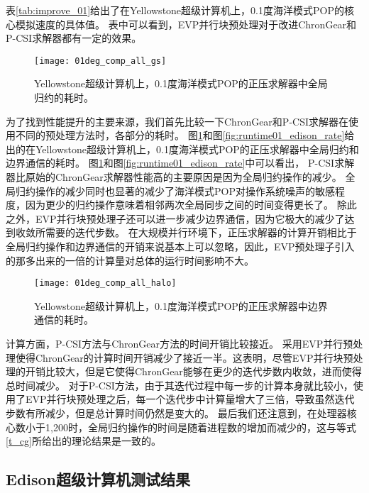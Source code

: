 表\ref{tab:improve_01}给出了在Yellowstone超级计算机上，0.1度海洋模式POP的核心模拟速度的具体值。
表中可以看到，EVP并行块预处理对于改进ChronGear和P-CSI求解器都有一定的效果。



\begin {figure}[!h]
\begin{center}
\texttt{[image: 01deg\_comp\_all\_gs]}
\end{center}
\caption[] {Yellowstone超级计算机上，0.1度海洋模式POP的正压求解器中全局归约的耗时。}
\label{fig:component_gs}
\end {figure}

为了找到性能提升的主要来源，我们首先比较一下ChronGear和P-CSI求解器在使用不同的预处理方法时，各部分的耗时。 
图\ref{fig:component_gs}和图\ref{fig:runtime01_edison_rate}给出的在Yellowstone超级计算机上，0.1度海洋模式POP的正压求解器中全局归约和边界通信的耗时。 
图\ref{fig:component_gs}和图\ref{fig:runtime01_edison_rate}中可以看出， P-CSI求解器比原始的ChronGear求解器性能高的主要原因是因为全局归约操作的减少。 
全局归约操作的减少同时也显著的减少了海洋模式POP对操作系统噪声的敏感程度\cite{ferreira}，因为更少的归约操作意味着相邻两次全局同步之间的时间变得更长了。 
除此之外，EVP并行块预处理子还可以进一步减少边界通信，因为它极大的减少了达到收敛所需要的迭代步数。 
在大规模并行环境下，正压求解器的计算开销相比于全局归约操作和边界通信的开销来说基本上可以忽略，因此，EVP预处理子引入的那多出来的一倍的计算量对总体的运行时间影响不大。

\begin {figure}[!h]
\begin{center}
\texttt{[image: 01deg\_comp\_all\_halo]}
\end{center}
\caption[] {Yellowstone超级计算机上，0.1度海洋模式POP的正压求解器中边界通信的耗时。}
\label{fig:component_halo}
\end {figure}
计算方面，P-CSI方法与ChronGear方法的时间开销比较接近。 
采用EVP并行预处理使得ChronGear的计算时间开销减少了接近一半。这表明，尽管EVP并行块预处理的开销比较大，但是它使得ChronGear能够在更少的迭代步数内收敛，进而使得总时间减少。 
对于P-CSI方法，由于其迭代过程中每一步的计算本身就比较小，使用了EVP并行块预处理之后，每一个迭代步中计算量增大了三倍，导致虽然迭代步数有所减少，但是总计算时间仍然是变大的。
最后我们还注意到，在处理器核心数小于1,200时，全局归约操作的时间是随着进程数的增加而减少的，这与等式\ref{t_cg}所给出的理论结果是一致的。

\subsection{Edison超级计算机测试结果}
\label{precond:exp:Edison}

